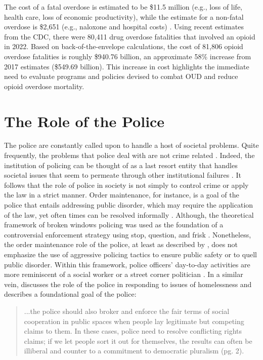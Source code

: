 The cost of a fatal overdose is estimated to be \$11.5 million (e.g., loss of life, health care, loss of economic productivity), while the estimate for a non-fatal overdose is \$2,651 (e.g., naloxone and hospital costs) \parencite{center_for_disease_control_and_prevention_economic_2020}. Using recent estimates from the CDC, there were 80,411 drug overdose fatalities that involved an opioid in 2022. Based on back-of-the-envelope calculations, the cost of 81,806 opioid overdose fatalities is roughly \$940.76 billion, an approximate 58\% increase from 2017 estimates (\$549.69 billion). This increase in cost highlights the immediate need to evaluate programs and policies devised to combat OUD and reduce opioid overdose mortality. 

\section{\centering The Role of the Police}
The police are constantly called upon to handle a host of societal problems. Quite frequently, the problems that police deal with are not crime related \parencite{mastrofski_police_1983, wilson_dilemmas_1968}. Indeed, the institution of policing can be thought of as a last resort entity that handles societal issues that seem to permeate through other institutional failures \parencite{bittner_police_1967}. It follows that the role of police in society is not simply to control crime or apply the law in a strict manner. Order maintenance, for instance, is a goal of the police that entails addressing public disorder, which may require the application of the law, yet often times can be resolved informally \parencite{kelling_broken_1982}. Although, the theoretical framework of broken windows policing was used as the foundation of a controversial enforcement strategy using stop, question, and frisk \parencite{white_federal_2016}. Nonetheless, the order maintenance role of the police, at least as described by \textcite{kelling_broken_1982}, does not emphasize the use of aggressive policing tactics to ensure public safety or to quell public disorder. Within this framework, police officers’ day-to-day activities are more reminiscent of a social worker or a street corner politician \parencite{muir_police_1979}. In a similar vein, \textcite{del_pozo_arrest_2022} discusses the role of the police in responding to issues of homelessness and describes a foundational goal of the police:

\begin{quote}
...the police should also broker and enforce the fair terms of social cooperation in public spaces when people lay legitimate but competing claims to them. In these cases, police need to resolve conflicting rights claims; if we let people sort it out for themselves, the results can often be illiberal and counter to a commitment to democratic pluralism (pg. 2).
\end{quote}

